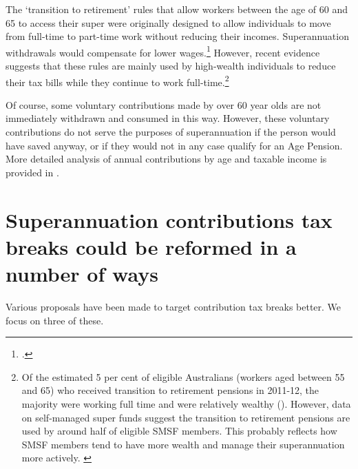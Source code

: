 The ‘transition to retirement’ rules that allow workers between the age of 60 and 65 to access their super were originally designed to allow individuals to move from full-time to part-time work without reducing their incomes. Superannuation withdrawals would compensate for lower wages.\footcite{ASIC2015TransitionToRetirement}  However, recent evidence suggests that these rules are mainly used by high-wealth individuals to reduce their tax bills while they continue to work full-time.\footnote{Of the estimated 5 per cent of eligible Australians (workers aged between 55 and 65) who received transition to retirement pensions in 2011-12, the majority were working full time and were relatively wealthy (\textcite[][20]{ProductivityCommission2015SuperPolicyPostRetirement}). However, data on self-managed super funds suggest the transition to retirement pensions are used by around half of eligible SMSF members. This probably reflects how SMSF members tend to have more wealth and manage their superannuation more actively. \textcite[][144]{ProductivityCommission2015SuperPolicyPostRetirement}}  

Of course, some voluntary contributions made by over 60 year olds are not immediately withdrawn and consumed in this way. However, these voluntary contributions do not serve the purposes of superannuation if the person would have saved anyway, or if they would not in any case qualify for an Age Pension. More detailed analysis of annual contributions by age and taxable income is provided in .

\section{Superannuation contributions tax breaks could be reformed in a number of ways}
Various proposals have been made to target contribution tax  breaks better. We focus on three of these.

